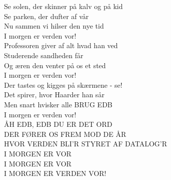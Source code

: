 Se solen, der skinner på kalv og på kid\\
Se parken, der dufter af vår\\
Nu sammen vi hilser den nye tid\\
I morgen er verden vor!\\

Professoren giver af alt hvad han ved\\
Studerende sandheden får\\
Og æren den venter på os et sted\\
I morgen er verden vor!\\

Der tastes og kigges på skærmene - se!\\
Det spirer, hvor Haarder han sår\\
Men snart hvisker alle BRUG EDB\\
I morgen er verden vor!\\

ÅH EDB, EDB DU ER DET ORD\\
DER FØRER OS FREM MOD DE ÅR\\
HVOR VERDEN BLI'R STYRET AF DATALOG'R\\
I MORGEN ER VOR\\
I MORGEN ER VOR\\
I MORGEN ER VERDEN VOR!\\

